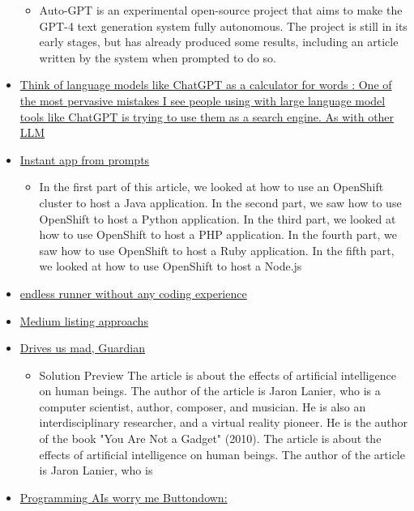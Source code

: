\begin{itemize}
  \begin{itemize}
  
  \item
    Auto-GPT is an experimental open-source project that aims to make
    the GPT-4 text generation system fully autonomous. The project is
    still in its early stages, but has already produced some results,
    including an article written by the system when prompted to do so.
  \end{itemize}
\item
  \href{https://simonwillison.net/2023/Apr/2/calculator-for-words/}{Think
  of language models like ChatGPT as a calculator for words : One of the
  most pervasive mistakes I see people using with large language model
  tools like ChatGPT is trying to use them as a search engine. As with
  other LLM}
\item
  \href{https://twitter.com/ronithhh/status/1641318606549176321}{Instant
  app from prompts}

  \begin{itemize}
  
  \item
    In the first part of this article, we looked at how to use an
    OpenShift cluster to host a Java application. In the second part, we
    saw how to use OpenShift to host a Python application. In the third
    part, we looked at how to use OpenShift to host a PHP application.
    In the fourth part, we saw how to use OpenShift to host a Ruby
    application. In the fifth part, we looked at how to use OpenShift to
    host a Node.js
  \end{itemize}
\item
  \href{https://replit.com/@asrsubs/SkyRoads-GPT-4}{endless runner
  without any coding experience}
\item
  \href{https://blog.medium.com/how-were-approaching-ai-generated-writing-on-medium-16ee8cb3bc89}{Medium
  listing approachs}
\item
  \href{https://www.theguardian.com/technology/2023/mar/23/tech-guru-jaron-lanier-the-danger-isnt-that-ai-destroys-us-its-that-it-drives-us-insane}{Drives
  us mad, Guardian}

  \begin{itemize}
  
  \item
    Solution Preview The article is about the effects of artificial
    intelligence on human beings. The author of the article is Jaron
    Lanier, who is a computer scientist, author, composer, and musician.
    He is also an interdisciplinary researcher, and a virtual reality
    pioneer. He is the author of the book "You Are Not a Gadget" (2010).
    The article is about the effects of artificial intelligence on human
    beings. The author of the article is Jaron Lanier, who is
  \end{itemize}
\item
  \href{https://buttondown.email/hillelwayne/archive/programming-ais-worry-me/}{Programming
  AIs worry me Buttondown:}


\end{itemize}
